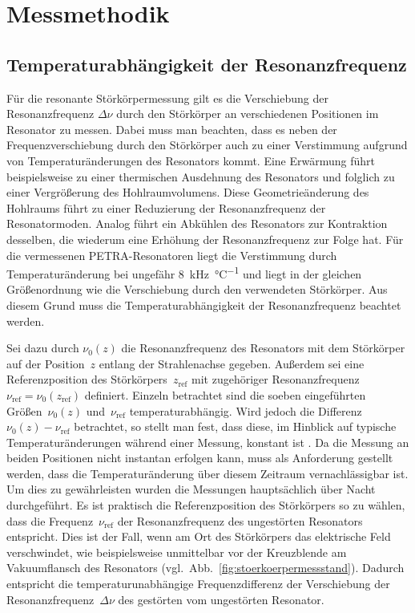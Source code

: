 \section{Messmethodik}

\subsection{Temperaturabhängigkeit der Resonanzfrequenz}
\label{sec:temperaturabh_resonanzfrequenz}
Für die resonante Störkörpermessung gilt es die Verschiebung der Resonanzfrequenz $\Delta \nu$ durch den Störkörper an verschiedenen Positionen im Resonator zu messen.
Dabei muss man beachten, dass es neben der Frequenzverschiebung durch den Störkörper auch zu einer Verstimmung aufgrund von Temperaturänderungen des Resonators kommt.
Eine Erwärmung führt beispielsweise zu einer thermischen Ausdehnung des Resonators und folglich zu einer Vergrößerung des Hohlraumvolumens.
Diese Geometrieänderung des Hohlraums führt zu einer Reduzierung der Resonanzfrequenz der Resonatormoden.
Analog führt ein Abkühlen des Resonators zur Kontraktion desselben, die wiederum eine Erhöhung der Resonanzfrequenz zur Folge hat. Für die vermessenen PETRA-Resonatoren liegt die Verstimmung durch Temperaturänderung bei ungefähr \SI{8}{\kilo\hertz\per\celsius} \cite{desy_petra} und liegt in der gleichen Größenordnung wie die Verschiebung durch den verwendeten Störkörper.
Aus diesem Grund muss die Temperaturabhängigkeit der Resonanzfrequenz beachtet werden.

Sei dazu durch $\nu_0(z)$ die Resonanzfrequenz des Resonators mit dem Störkörper auf der Position~$z$ entlang der Strahlenachse gegeben.
Außerdem sei eine Referenzposition des Störkörpers~$z_\mathrm{ref}$ mit zugehöriger Resonanzfrequenz~$\nu_\mathrm{ref} = \nu_0(z_\mathrm{ref})$ definiert.
Einzeln betrachtet sind die soeben eingeführten Größen~$\nu_0(z)$ und~$\nu_\mathrm{ref}$ temperaturabhängig.
Wird jedoch die Differenz~$\nu_0(z) - \nu_\mathrm{ref}$ betrachtet, so stellt man fest, dass diese, im Hinblick auf typische Temperaturänderungen während einer Messung, konstant ist \cite{schedler_pm}.
Da die Messung an beiden Positionen nicht instantan erfolgen kann, muss als Anforderung gestellt werden, dass die Temperaturänderung über diesem Zeitraum vernachlässigbar ist.
Um dies zu gewährleisten wurden die Messungen hauptsächlich über Nacht durchgeführt.
Es ist praktisch die Referenzposition des Störkörpers so zu wählen, dass die Frequenz~$\nu_\mathrm{ref}$ der Resonanzfrequenz des ungestörten Resonators entspricht.
Dies ist der Fall, wenn am Ort des Störkörpers das elektrische Feld verschwindet, wie beispielsweise unmittelbar vor der Kreuzblende am Vakuumflansch des Resonators (vgl.\ Abb.\ \ref{fig:stoerkoerpermessstand}).
Dadurch entspricht die temperaturunabhängige Frequenzdifferenz der Verschiebung der Resonanzfrequenz~$\Delta \nu$ des gestörten vom ungestörten Resonator.


